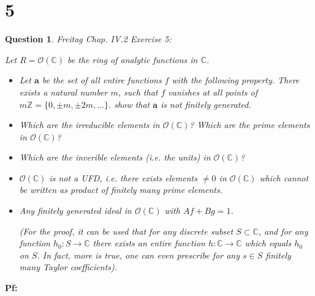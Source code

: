\documentclass{article}
\newtheorem{question}{Question}
\begin{document}
\section*{5}
\begin{myBox}[]{}
    \begin{question}
        Freitag Chap. IV.2 Exercise 5:

        Let $R=\mathcal{O}(\mathbb{C})$ be the ring of analytic functions in $\mathbb{C}$.
        \begin{itemize}
            \item[(a)] Let $\textbf{a}$ be the set of all entire functions $f$ with the following property.
            There exists a natural number $m$, such that $f$ vanishes at all points of $m\mathbb{Z}=\{0,\pm m,\pm 2m,...\}$.
            show that $\textbf{a}$ is not finitely generated.
            \item[(b)] Which are the irreducible elements in $\mathcal{O}(\mathbb{C})$? Which are the prime elements in $\mathcal{O}(\mathbb{C})$?
            \item[(c)] Which are the inverible elements (i.e. the units) in $\mathcal{O}(\mathbb{C})$?
            \item[(d)] $\mathcal{O}(\mathbb{C})$ is not a UFD, i.e. there exists elements $\neq 0$ in $\mathcal{O}(\mathbb{C})$ which cannot be written as product of finitely many prime elements.
            \item[(e)] Any finitely generated ideal in $\mathcal{O}(\mathbb{C})$ with $Af+Bg=1$.
            
            (For the proof, it can be used that for any discrete subset $S\subset\mathbb{C}$, and for
            any function $h_0:S\rightarrow\mathbb{C}$ there exists an entire function $h:\mathbb{C}\rightarrow\mathbb{C}$ which
            equals $h_0$ on $S$. In fact, more is true, one can even prescribe for any $s\in S$
            finitely many Taylor coefficients).
        \end{itemize}
    \end{question}
\end{myBox}

\textbf{Pf:}
\end{document}
